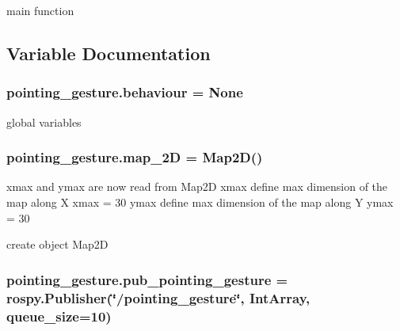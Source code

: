 main function 



\subsection{Variable Documentation}
\subsubsection[{\texorpdfstring{behaviour}{behaviour}}]{\setlength{\rightskip}{0pt plus 5cm}pointing\+\_\+gesture.\+behaviour = None}\hypertarget{namespacepointing__gesture_a16dc32bb0bc4ae96f247e60f4671e69f}{}\label{namespacepointing__gesture_a16dc32bb0bc4ae96f247e60f4671e69f}


global variables 

\subsubsection[{\texorpdfstring{map\+\_\+2D}{map_2D}}]{\setlength{\rightskip}{0pt plus 5cm}pointing\+\_\+gesture.\+map\+\_\+2D = {\bf Map2D}()}\hypertarget{namespacepointing__gesture_a08e4083045796d171c79d2538f1b9948}{}\label{namespacepointing__gesture_a08e4083045796d171c79d2538f1b9948}


xmax and ymax are now read from Map2D xmax define max dimension of the map along X xmax = 30 ymax define max dimension of the map along Y ymax = 30 

create object Map2D 
\subsubsection[{\texorpdfstring{pub\+\_\+pointing\+\_\+gesture}{pub_pointing_gesture}}]{\setlength{\rightskip}{0pt plus 5cm}pointing\+\_\+gesture.\+pub\+\_\+pointing\+\_\+gesture = rospy.\+Publisher(\char`\"{}/pointing\+\_\+gesture\char`\"{}, Int\+Array, queue\+\_\+size=10)}\hypertarget{namespacepointing__gesture_a0a5243d3050e55cb47090bcfece22c5d}{}\label{namespacepointing__gesture_a0a5243d3050e55cb47090bcfece22c5d}


